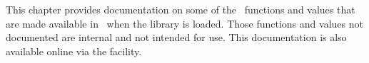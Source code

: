 This chapter provides documentation on some of the \ML\ functions and values
that are made available in \HOL\ when the  library is loaded. Those
functions and values not documented are internal and not intended for use.
This documentation is also available online via the  facility.


